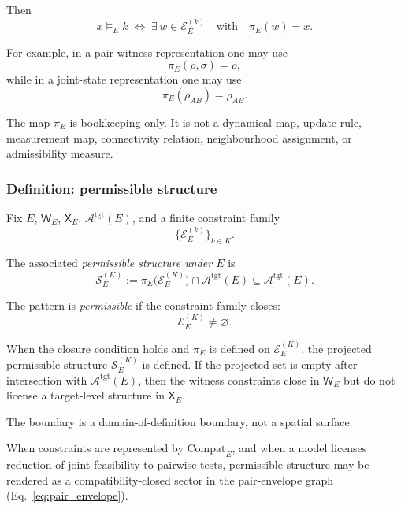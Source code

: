 \documentclass[aps,prx,onecolumn,11pt]{revtex4-2}
\theoremstyle{plain}
\theoremstyle{definition}
\theoremstyle{remark}
\begin{document}
Then
\begin{equation}
x\models_E k
\;\Longleftrightarrow\;
\exists\,w\in\mathcal{E}^{(k)}_E
\quad
\text{with}
\quad
\pi_E(w)=x.
\label{eq:permissible_structure_witnessing_convention}
\end{equation}

For example, in a pair-witness representation one may use
\[
\pi_E(\rho,\sigma)=\rho,
\]
while in a joint-state representation one may use
\[
\pi_E(\rho_{AB})=\rho_{AB}.
\]

The map \(\pi_E\) is bookkeeping only. It is not a dynamical map, update
rule, measurement map, connectivity relation, neighbourhood assignment,
or admissibility measure.

\subsubsection{Definition: permissible structure}
\label{subsubsec:permissible_structure_def_struct}

Fix \(E\), \(\mathsf{W}_E\), \(\mathsf{X}_E\),
\(\mathcal{A}^{\mathrm{tgt}}(E)\), and a finite constraint family
\[
\{\mathcal{E}^{(k)}_E\}_{k\in K}.
\]

The associated \emph{permissible structure under \(E\)} is
\begin{equation}
\mathcal{S}^{(K)}_E
:=
\pi_E\bigl(\mathcal{E}^{(K)}_E\bigr)
\cap
\mathcal{A}^{\mathrm{tgt}}(E)
\subseteq
\mathcal{A}^{\mathrm{tgt}}(E).
\label{eq:permissible_structure_set_def}
\end{equation}

The pattern is \emph{permissible} if the constraint family closes:
\begin{equation}
\mathcal{E}^{(K)}_E
\neq
\varnothing.
\label{eq:permissible_structure_closure}
\end{equation}

When the closure condition holds and \(\pi_E\) is defined on
\(\mathcal{E}^{(K)}_E\), the projected permissible structure
\(\mathcal{S}^{(K)}_E\) is defined. If the projected set is empty after
intersection with \(\mathcal{A}^{\mathrm{tgt}}(E)\), then the witness
constraints close in \(\mathsf{W}_E\) but do not license a target-level
structure in \(\mathsf{X}_E\).

The boundary is a domain-of-definition boundary, not a spatial surface.

When constraints are represented by \(\mathrm{Compat}_E\), and when a
model licenses reduction of joint feasibility to pairwise tests,
permissible structure may be rendered as a compatibility-closed sector
in the pair-envelope graph
(Eq.~\ref{eq:pair_envelope}).
\end{document}
